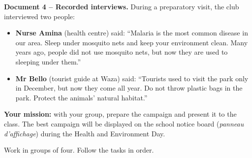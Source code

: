 \documentclass[11pt]{article}
\newcounter{popsec}
\newcounter{popsub}
\newcommand{\courssub}[1]{%
  \stepcounter{popsub}%
  \par\vspace{9pt}\noindent{\popxbold\fontsize{11.5}{13}\selectfont\color{popink}{\color{poporange}\thepopsec.\thepopsub}\hspace{6pt}#1}\par\nopagebreak\vspace{4pt}
}
\begin{document}
\textbf{Document 4 -- Recorded interviews.} During a preparatory visit, the club interviewed two people:

\begin{itemize}
\item \textbf{Nurse Amina} (health centre) said: ``Malaria is the most common disease in our area. Sleep under mosquito nets and keep your environment clean. Many years ago, people did not use mosquito nets, but now they are used to sleeping under them.''
\item \textbf{Mr Bello} (tourist guide at Waza) said: ``Tourists used to visit the park only in December, but now they come all year. Do not throw plastic bags in the park. Protect the animals' natural habitat.''
\end{itemize}

\textbf{Your mission:} with your group, prepare the campaign and present it to the class. The best campaign will be displayed on the school notice board (\emph{panneau d'affichage}) during the Health and Environment Day.

\courssub{Consignes}

Work in groups of four. Follow the tasks in order.
\end{document}
